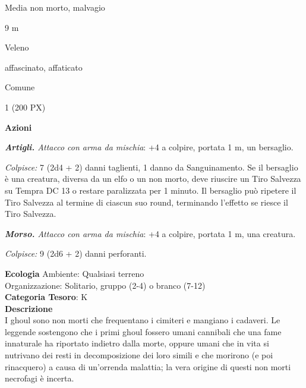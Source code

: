 \begin{multicols}{2}
{
\begin{description}[noitemsep, topsep=0pt, parsep=0pt, partopsep=0pt, itemsep=1pt, leftmargin=2.35cm,  labelwidth=2.2cm, itemindent=0cm, listparindent=0pt] %
\setlength{\baselineskip}{10pt}
\item[\textbf{Taglia/Tipo}] Media non morto, malvagio
\item[\textbf{Caratt.}] 
\item[\textbf{Punti Ferita}] 
\item[\textbf{Movimento}] 9 m
\item[\textbf{Tiri Salvez.}] 
\item[\textbf{Imm. Danni}] Veleno
\item[\textbf{Immunità}] affascinato, affaticato
\item[\textbf{Sensi}] 
\item[\textbf{Linguaggi}] Comune
\item[\textbf{Sfida}] 1 (200 PX)
\end{description}
\smallskip

\textbf{Azioni}

\emph{\textbf{Artigli.} Attacco con arma da mischia}: +4 a colpire, portata 1 m, un bersaglio.

\emph{Colpisce:} 7 (2d4 + 2) danni taglienti, 1 danno da Sanguinamento. Se il bersaglio è una creatura, diversa da un elfo o un non morto, deve riuscire un Tiro Salvezza su Tempra DC 13 o restare paralizzata per 1 minuto. Il bersaglio può ripetere il Tiro Salvezza al termine di ciascun suo round, terminando l'effetto se riesce il Tiro Salvezza.

\emph{\textbf{Morso.} Attacco con arma da mischia}: +4 a colpire, portata 1 m, una creatura.

\emph{Colpisce:} 9 (2d6 + 2) danni perforanti.

\textbf{Ecologia}
Ambiente: Qualsiasi terreno\\
Organizzazione: Solitario, gruppo (2-4) o branco (7-12)\\
\textbf{Categoria Tesoro}: K\\
\textbf{Descrizione}\\
I ghoul sono non morti che frequentano i cimiteri e mangiano i cadaveri. Le leggende sostengono che i primi ghoul fossero umani cannibali che una fame innaturale ha riportato indietro dalla morte, oppure umani che in vita si nutrivano dei resti in decomposizione dei loro simili e che morirono (e poi rinacquero) a causa di un'orrenda malattia; la vera origine di questi non morti necrofagi è incerta.

}
\end{multicols}
